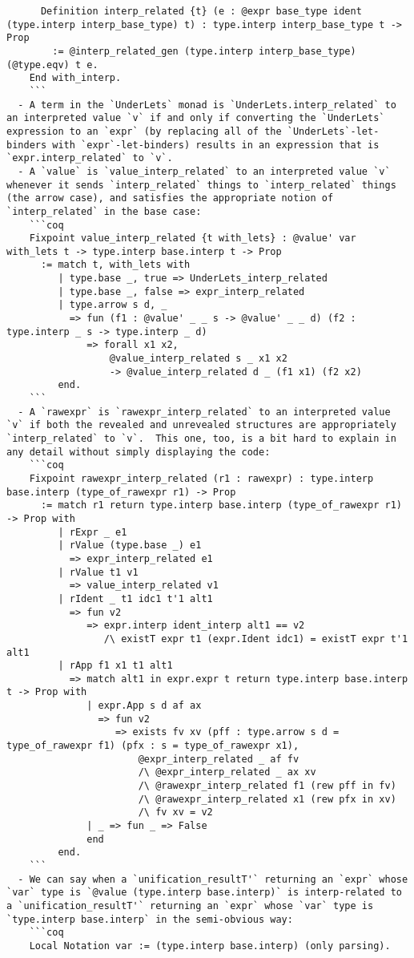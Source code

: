 \begin{itemize}
\begin{verbatim}
      Definition interp_related {t} (e : @expr base_type ident (type.interp interp_base_type) t) : type.interp interp_base_type t -> Prop
        := @interp_related_gen (type.interp interp_base_type) (@type.eqv) t e.
    End with_interp.
    ```
  - A term in the `UnderLets` monad is `UnderLets.interp_related` to an interpreted value `v` if and only if converting the `UnderLets` expression to an `expr` (by replacing all of the `UnderLets`-let-binders with `expr`-let-binders) results in an expression that is `expr.interp_related` to `v`.
  - A `value` is `value_interp_related` to an interpreted value `v` whenever it sends `interp_related` things to `interp_related` things (the arrow case), and satisfies the appropriate notion of `interp_related` in the base case:
    ```coq
    Fixpoint value_interp_related {t with_lets} : @value' var with_lets t -> type.interp base.interp t -> Prop
      := match t, with_lets with
         | type.base _, true => UnderLets_interp_related
         | type.base _, false => expr_interp_related
         | type.arrow s d, _
           => fun (f1 : @value' _ _ s -> @value' _ _ d) (f2 : type.interp _ s -> type.interp _ d)
              => forall x1 x2,
                  @value_interp_related s _ x1 x2
                  -> @value_interp_related d _ (f1 x1) (f2 x2)
         end.
    ```
  - A `rawexpr` is `rawexpr_interp_related` to an interpreted value `v` if both the revealed and unrevealed structures are appropriately `interp_related` to `v`.  This one, too, is a bit hard to explain in any detail without simply displaying the code:
    ```coq
    Fixpoint rawexpr_interp_related (r1 : rawexpr) : type.interp base.interp (type_of_rawexpr r1) -> Prop
      := match r1 return type.interp base.interp (type_of_rawexpr r1) -> Prop with
         | rExpr _ e1
         | rValue (type.base _) e1
           => expr_interp_related e1
         | rValue t1 v1
           => value_interp_related v1
         | rIdent _ t1 idc1 t'1 alt1
           => fun v2
              => expr.interp ident_interp alt1 == v2
                 /\ existT expr t1 (expr.Ident idc1) = existT expr t'1 alt1
         | rApp f1 x1 t1 alt1
           => match alt1 in expr.expr t return type.interp base.interp t -> Prop with
              | expr.App s d af ax
                => fun v2
                   => exists fv xv (pff : type.arrow s d = type_of_rawexpr f1) (pfx : s = type_of_rawexpr x1),
                       @expr_interp_related _ af fv
                       /\ @expr_interp_related _ ax xv
                       /\ @rawexpr_interp_related f1 (rew pff in fv)
                       /\ @rawexpr_interp_related x1 (rew pfx in xv)
                       /\ fv xv = v2
              | _ => fun _ => False
              end
         end.
    ```
  - We can say when a `unification_resultT'` returning an `expr` whose `var` type is `@value (type.interp base.interp)` is interp-related to a `unification_resultT'` returning an `expr` whose `var` type is `type.interp base.interp` in the semi-obvious way:
    ```coq
    Local Notation var := (type.interp base.interp) (only parsing).


\end{verbatim}
\end{itemize}
